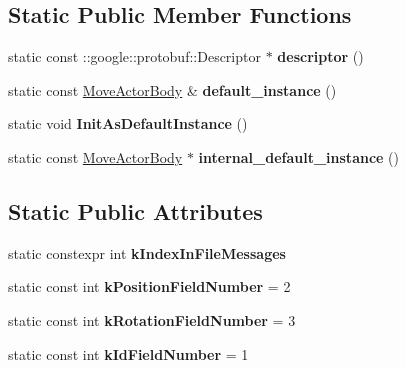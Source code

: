 \subsection*{Static Public Member Functions}
\begin{DoxyCompactItemize}
\item 
\mbox{\label{classtbBasics_1_1MoveActorBody_a3fea420c55fbb1398c46118ce1edcd1e}} 
static const \+::google\+::protobuf\+::\+Descriptor $\ast$ {\bfseries descriptor} ()
\item 
\mbox{\label{classtbBasics_1_1MoveActorBody_acfcb4107050ab6ab7230e7dbe1688cbc}} 
static const \hyperlink{classtbBasics_1_1MoveActorBody}{Move\+Actor\+Body} \& {\bfseries default\+\_\+instance} ()
\item 
\mbox{\label{classtbBasics_1_1MoveActorBody_a2644c62f38dfae4256c53aa346e91518}} 
static void {\bfseries Init\+As\+Default\+Instance} ()
\item 
\mbox{\label{classtbBasics_1_1MoveActorBody_a549c6aebc32a7a9e8d55460deaa3b4db}} 
static const \hyperlink{classtbBasics_1_1MoveActorBody}{Move\+Actor\+Body} $\ast$ {\bfseries internal\+\_\+default\+\_\+instance} ()
\end{DoxyCompactItemize}
\subsection*{Static Public Attributes}
\begin{DoxyCompactItemize}
\item 
static constexpr int {\bfseries k\+Index\+In\+File\+Messages}
\item 
\mbox{\label{classtbBasics_1_1MoveActorBody_a3f42981f1e31cef1acd1e38ce8df9b27}} 
static const int {\bfseries k\+Position\+Field\+Number} = 2
\item 
\mbox{\label{classtbBasics_1_1MoveActorBody_a6e4100f6c74aed4107eec460d82d0b53}} 
static const int {\bfseries k\+Rotation\+Field\+Number} = 3
\item 
\mbox{\label{classtbBasics_1_1MoveActorBody_a5282a741bb2e71dd04cd567c7b9919b5}} 
static const int {\bfseries k\+Id\+Field\+Number} = 1
\end{DoxyCompactItemize}
